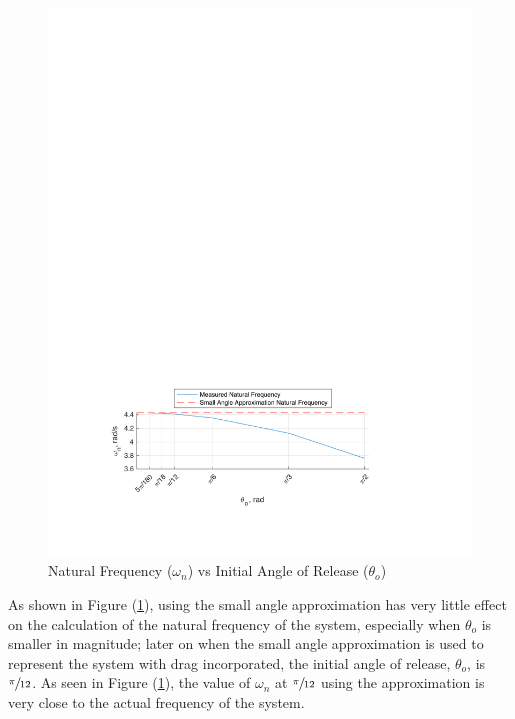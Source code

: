 \documentclass[12pt]{report}
\begin{document}
\begin{flushleft}
\begin{figure}[ht]
  \includegraphics[center,width=.9\textwidth]{natfreq}
  \caption{Natural Frequency ($\omega_n$) vs Initial Angle of Release ($\theta_o$)}
  \label{fig:freq}
\end{figure}
\newpage
As shown in Figure (\ref{fig:freq}), using the small angle approximation has very
little effect on the calculation of the natural frequency of the system, especially
when $\theta_o$ is smaller in magnitude; later on when the small angle
approximation is used to represent the system with drag incorporated, the initial
angle of release, $\theta_o$, is $\sfrac{\pi}{12}$. As seen in Figure (\ref{fig:freq}),
the value of $\omega_n$ at $\sfrac{\pi}{12}$ using the approximation is very
close to the actual frequency of the system.


\end{flushleft}
\end{document}
